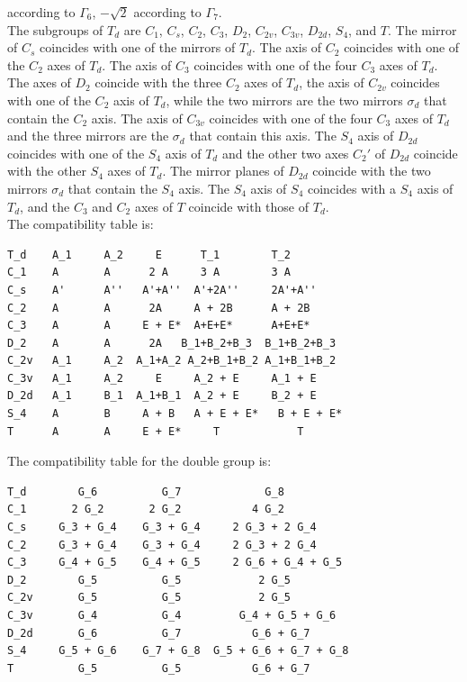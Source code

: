 \documentclass[12pt,a4paper]{article}
\begin{document}
according to $\Gamma_6$, $-\sqrt{2}$ according to $\Gamma_7$. \\
The subgroups of $T_d$ are $C_1$, $C_s$, $C_2$, $C_3$, $D_2$, $C_{2v}$,
$C_{3v}$, $D_{2d}$, $S_4$, and $T$. The mirror of $C_s$ coincides with one
of the mirrors of $T_d$. The axis of $C_2$ coincides with one of the $C_2$
axes of $T_d$. The axis of $C_3$ coincides with one of the four $C_3$
axes of $T_d$. The axes of $D_2$ coincide with the three $C_2$ axes of
$T_d$, the axis of $C_{2v}$ coincides with one of the $C_2$ axis of 
$T_d$, while the two mirrors are the two mirrors $\sigma_d$ that contain
the $C_2$ axis. The axis of $C_{3v}$ coincides with one of the four
$C_3$ axes of $T_d$ and the three mirrors are the $\sigma_d$ that 
contain this axis. The $S_4$ axis of $D_{2d}$ coincides with one of
the $S_4$ axis of $T_d$ and the other two axes $C_2'$ of $D_{2d}$ coincide with the 
other $S_4$ axes of $T_d$. The mirror planes of $D_{2d}$ coincide with the two
mirrors $\sigma_d$ that contain the $S_4$ axis. The $S_4$ axis of $S_4$ 
coincides with a $S_4$ axis of $T_d$, and the $C_3$ and $C_2$ axes of $T$ 
coincide with those of $T_d$. \\
The compatibility table is:
\begin{verbatim}
T_d    A_1     A_2     E      T_1        T_2
C_1    A       A      2 A     3 A        3 A
C_s    A'      A''   A'+A''  A'+2A''     2A'+A''
C_2    A       A      2A     A + 2B      A + 2B
C_3    A       A     E + E*  A+E+E*      A+E+E*
D_2    A       A      2A   B_1+B_2+B_3  B_1+B_2+B_3
C_2v   A_1     A_2  A_1+A_2 A_2+B_1+B_2 A_1+B_1+B_2
C_3v   A_1     A_2     E     A_2 + E     A_1 + E   
D_2d   A_1     B_1  A_1+B_1  A_2 + E     B_2 + E
S_4    A       B     A + B   A + E + E*   B + E + E*  
T      A       A     E + E*     T            T
\end{verbatim}
The compatibility table for the double group is:
\begin{verbatim}
T_d        G_6          G_7             G_8
C_1       2 G_2       2 G_2           4 G_2
C_s     G_3 + G_4    G_3 + G_4     2 G_3 + 2 G_4
C_2     G_3 + G_4    G_3 + G_4     2 G_3 + 2 G_4
C_3     G_4 + G_5    G_4 + G_5     2 G_6 + G_4 + G_5
D_2        G_5          G_5            2 G_5
C_2v       G_5          G_5            2 G_5
C_3v       G_4          G_4         G_4 + G_5 + G_6
D_2d       G_6          G_7           G_6 + G_7
S_4     G_5 + G_6    G_7 + G_8  G_5 + G_6 + G_7 + G_8  
T          G_5          G_5           G_6 + G_7
\end{verbatim}
\end{document}
